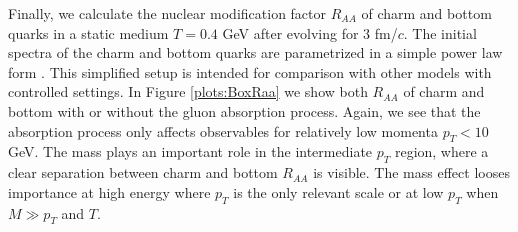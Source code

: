 \documentclass[aps, prc, reprint, amsmath, groupedaddress, nofootinbib]{revtex4-1}
\begin{document}
Finally, we calculate the nuclear modification factor $R_{AA}$ of charm and bottom quarks in a static medium $T=0.4$ GeV after evolving for $3$ fm/$c$.
The initial spectra of the charm and bottom quarks are parametrized in a simple power law form \cite{Cao:2012jt}.
This simplified setup is intended for comparison with other models with controlled settings.
In Figure \ref{plots:BoxRaa} we show both $R_{AA}$ of charm and bottom with or without the gluon absorption process. 
Again, we see that the absorption process only affects observables for relatively low momenta $p_T < 10$ GeV.
The mass plays an important role in the intermediate $p_T$ region, where a clear separation between charm and bottom $R_{AA}$ is visible.
The mass effect looses importance at high energy where $p_T$ is the only relevant scale or at low $p_T$ when $M \gg p_T$ and $T$. 
\end{document}
